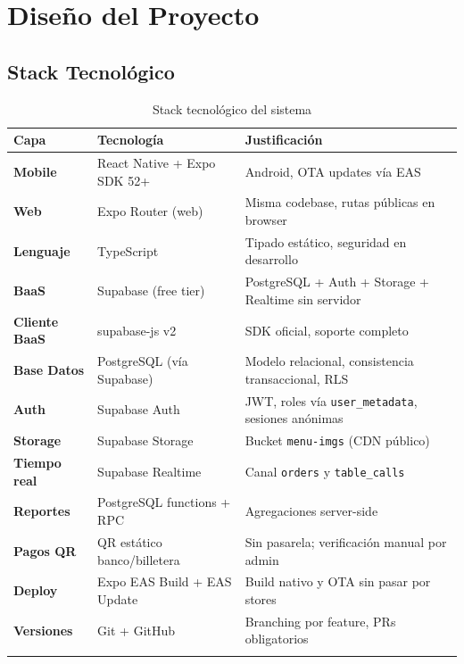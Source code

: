 \chapter{Diseño del Proyecto}

\section{Stack Tecnológico}

\begin{longtable}{>{\bfseries}p{3cm} p{4cm} p{5.5cm}}
  \toprule
  \textbf{Capa} & \textbf{Tecnología} & \textbf{Justificación} \\
  \midrule
  \endhead
  Mobile         & React Native + Expo SDK 52+   & Android, OTA updates vía EAS \\[3pt]
  Web            & Expo Router (web) & Misma codebase, rutas públicas en browser \\[3pt]
  Lenguaje       & TypeScript                    & Tipado estático, seguridad en desarrollo \\[3pt]
  BaaS           & Supabase (free tier)          & PostgreSQL + Auth + Storage + Realtime sin servidor \\[3pt]
  Cliente BaaS   & supabase-js v2                & SDK oficial, soporte completo \\[3pt]
  Base Datos  & PostgreSQL (vía Supabase)     & Modelo relacional, consistencia transaccional, RLS \\[3pt]
  Auth           & Supabase Auth                 & JWT, roles vía \texttt{user\_metadata}, sesiones anónimas \\[3pt]
  Storage        & Supabase Storage              & Bucket \texttt{menu-imgs} (CDN público) \\[3pt]
  Tiempo real    & Supabase Realtime             & Canal \texttt{orders} y \texttt{table\_calls} \\[3pt]
  Reportes       & PostgreSQL functions + RPC    & Agregaciones server-side \\[3pt]
  Pagos QR       & QR estático banco/billetera   & Sin pasarela; verificación manual por admin \\[3pt]
  Deploy         & Expo EAS Build + EAS Update   & Build nativo y OTA sin pasar por stores \\[3pt]
  Versiones      & Git + GitHub                  & Branching por feature, PRs obligatorios \\
  \bottomrule
  \caption{Stack tecnológico del sistema}
\end{longtable}

